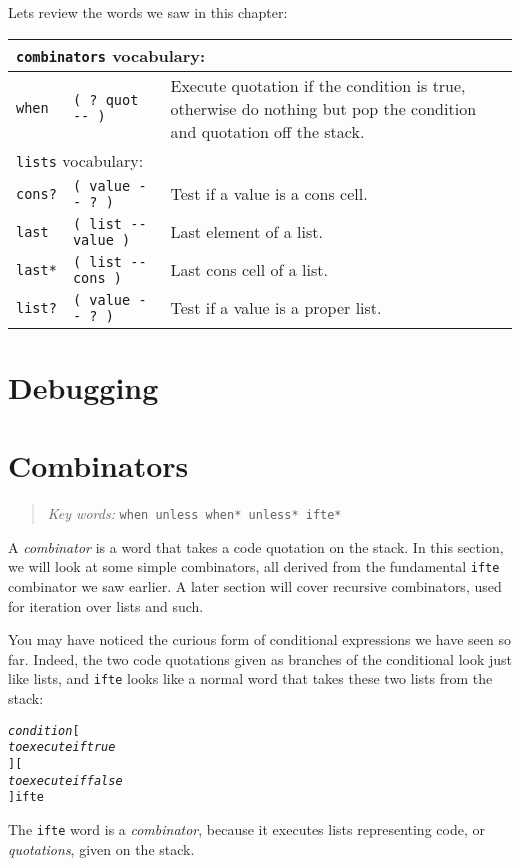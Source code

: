 \documentclass[english]{book}
\newcommand{\chapkeywords}[1]{%
\begin{quote}
\emph{Key words:} \texttt{#1}
\end{quote}
}
\newcommand{\wordtable}[1]{{
\begin{tabularx}{12cm}{|l l X|}
#1
\hline
\end{tabularx}}}
\newcommand{\tabvocab}[1]{
\hline
\multicolumn{3}{|l|}{
\rule[-2mm]{0mm}{6mm}
\texttt{#1} vocabulary:}
\\
\hline
}
\begin{document}
Lets review the words we saw in this chapter:

\wordtable{
\tabvocab{combinators}
\texttt{when}&
\texttt{( ?~quot -{}- )}&
Execute quotation if the condition is true, otherwise do nothing but pop the condition and quotation off the stack.\\
\tabvocab{lists}
\texttt{cons?}&
\texttt{( value -{}- ?~)}&
Test if a value is a cons cell.\\
\texttt{last}&
\texttt{( list -{}- value )}&
Last element of a list.\\
\texttt{last*}&
\texttt{( list -{}- cons )}&
Last cons cell of a list.\\
\texttt{list?}&
\texttt{( value -{}- ?~)}&
Test if a value is a proper list.\\
}

\section{Debugging}

\section{Combinators}

\chapkeywords{when unless when* unless* ifte*}

A \emph{combinator} is a word that takes a code quotation on the stack. In this section, we will look at some simple combinators, all derived from the fundamental \texttt{ifte} combinator we saw earlier. A later section will cover recursive combinators, used for iteration over lists and such.

You may have noticed the curious form of conditional expressions we have seen so far. Indeed, the two code quotations given as branches of the conditional look just like lists, and \texttt{ifte} looks like a normal word that takes these two lists from the stack:

\begin{alltt}
\emph{condition} {[}
    \emph{to execute if true}
{] [}
    \emph{to execute if false}
{]} ifte
\end{alltt}

The \texttt{ifte} word is a \emph{combinator}, because it executes lists representing code, or \emph{quotations}, given on the stack.
\end{document}
